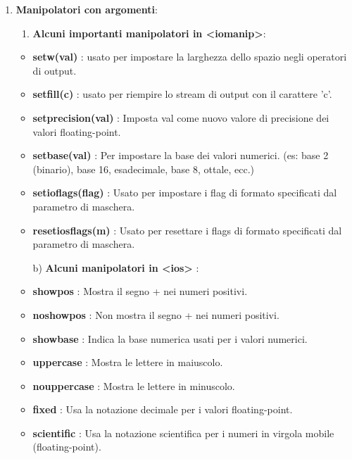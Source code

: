 \begin{enumerate}
	\item \textsf{\small \textbf{Manipolatori con argomenti}: }
	\begin{enumerate}
		\item \textsf{\small \textbf{Alcuni importanti manipolatori in <iomanip>}: }
	\end{enumerate}
		\begin{itemize}
			\item \textsf{\small \textbf{setw(val)} : usato per impostare la larghezza dello spazio negli operatori di output.}
			\item \textsf{\small \textbf{setfill(c)} : usato per riempire lo stream di output con il carattere 'c'.}
			\item \textsf{\small \textbf{setprecision(val)} : Imposta val come nuovo valore di precisione dei valori floating-point.}
			\item \textsf{\small \textbf{setbase(val)} : Per impostare la base dei valori numerici. (es: base 2 (binario), base 16, esadecimale, base 8, ottale, ecc.)}
			\item \textsf{\small \textbf{setioflags(flag)} : Usato per impostare i flag di formato specificati dal parametro di maschera.}
			\item \textsf{\small \textbf{resetiosflags(m)} : Usato per resettare i flags di formato specificati dal parametro di maschera.}
		\end{itemize}
	\begin{enumerate}
		\item[b)] \textsf{\small \textbf{Alcuni manipolatori in <ios>} : }
	\end{enumerate}
		\begin{itemize}
			\item \textsf{\small \textbf{showpos} : Mostra il segno + nei numeri positivi.}
			\item \textsf{\small \textbf{noshowpos} : Non mostra il segno + nei numeri positivi.}
			\item \textsf{\small \textbf{showbase} : Indica la base numerica usati per i valori numerici.}
			\item \textsf{\small \textbf{uppercase} : Mostra le lettere in maiuscolo.}
			\item \textsf{\small \textbf{nouppercase} : Mostra le lettere in minuscolo.}
			\item \textsf{\small \textbf{fixed} : Usa la notazione decimale per i valori floating-point.}
			\item \textsf{\small \textbf{scientific} : Usa la notazione scientifica per i numeri in virgola mobile (floating-point).}

\end{itemize}
\end{enumerate}
